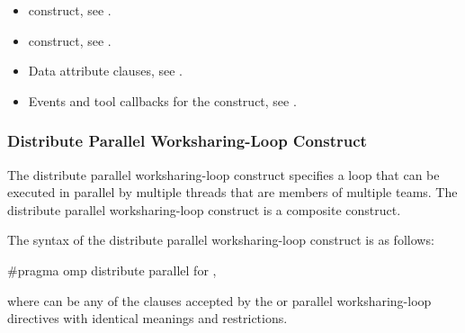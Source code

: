 \crossreferences
\begin{itemize}
\item {} construct, see
.

\item {} construct, see
.

\item Data attribute clauses, see
.

\item Events and tool callbacks for the  construct, see
.

\end{itemize}









\subsubsection{Distribute Parallel Worksharing-Loop Construct}
\label{subsec:Distribute Parallel Worksharing-Loop Construct}
\summary
The distribute parallel worksharing-loop construct specifies a loop that can be executed in parallel by
multiple threads that are members of multiple teams. The distribute parallel worksharing-loop construct is a composite construct.

\syntax
The syntax of the distribute parallel worksharing-loop construct is as follows:

\begin{ccppspecific}
\begin{ompcPragma}
#pragma omp distribute parallel for \plc{[clause[ [},\plc{] clause] ... ] newline}
\end{ompcPragma}

where  can be any of the clauses accepted by the 
or parallel worksharing-loop directives with identical meanings and restrictions.
\end{ccppspecific}

